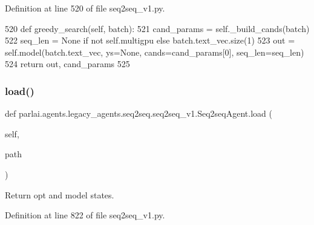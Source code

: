 Definition at line 520 of file seq2seq\+\_\+v1.\+py.


\begin{DoxyCode}
520     \textcolor{keyword}{def }greedy\_search(self, batch):
521         cand\_params = self.\_build\_cands(batch)
522         seq\_len = \textcolor{keywordtype}{None} \textcolor{keywordflow}{if} \textcolor{keywordflow}{not} self.multigpu \textcolor{keywordflow}{else} batch.text\_vec.size(1)
523         out = self.model(batch.text\_vec, ys=\textcolor{keywordtype}{None}, cands=cand\_params[0], seq\_len=seq\_len)
524         \textcolor{keywordflow}{return} out, cand\_params
525 
\end{DoxyCode}
\mbox{\label{classparlai_1_1agents_1_1legacy__agents_1_1seq2seq_1_1seq2seq__v1_1_1Seq2seqAgent_a3ee5ae38c0e37bcc1e4eb44bae8a3cce}} 
\subsubsection{\texorpdfstring{load()}{load()}}
{\footnotesize\ttfamily def parlai.\+agents.\+legacy\+\_\+agents.\+seq2seq.\+seq2seq\+\_\+v1.\+Seq2seq\+Agent.\+load (\begin{DoxyParamCaption}\item[{}]{self,  }\item[{}]{path }\end{DoxyParamCaption})}

\begin{DoxyVerb}Return opt and model states.
\end{DoxyVerb}
 

Definition at line 822 of file seq2seq\+\_\+v1.\+py.


